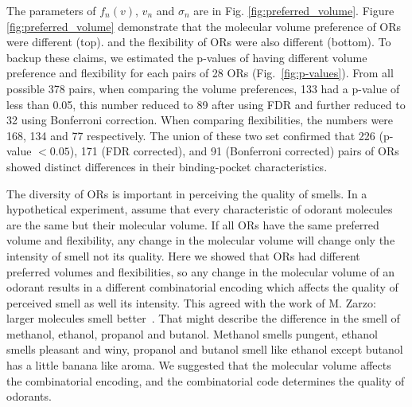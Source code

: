\documentclass[11pt]{paper} %
\newcommand{\numberofreceptors}{ 28 }
\begin{document}
The parameters of $f_n(v)$, $v_n$ and $\sigma_n$ are in Fig. \ref{fig:preferred_volume}.
Figure \ref{fig:preferred_volume} demonstrate that the molecular volume preference of ORs were different (top). 
and the flexibility of ORs were also different (bottom).
To backup these claims, 
we estimated the p-values of having different volume preference and flexibility for each pairs of \numberofreceptors ORs
(Fig.~\ref{fig:p-values}). 
From all possible 378 pairs, 
when comparing the volume preferences, 
133 had a p-value of less than 0.05, 
this number reduced to 89 after using FDR and further reduced to 32 using Bonferroni correction.
When comparing flexibilities, 
the numbers were 168, 134 and 77 respectively. 
The union of these two set confirmed that 226 (p-value $<0.05$), 171 (FDR corrected), and 91 (Bonferroni corrected) pairs of ORs showed distinct differences in their binding-pocket characteristics.

The diversity of ORs is important in perceiving the quality of smells. 
In a hypothetical experiment, 
assume that every characteristic of odorant molecules are the same but their molecular volume.
If all ORs  have the same preferred volume and flexibility, 
any change in the molecular volume will change only the intensity of smell not its quality.
Here we showed that ORs  had different preferred volumes and flexibilities, 
so any change in the molecular volume of an odorant results in a different combinatorial encoding which affects the quality of perceived smell as well its intensity.
This agreed with the work of M. Zarzo: larger molecules  smell better~\cite{zarzo2011}.
That might describe the difference in the smell of methanol, ethanol, propanol and butanol. 
Methanol smells pungent, ethanol smells pleasant and winy, propanol and butanol smell like ethanol except butanol has a little banana like aroma.
We suggested that the molecular volume affects the combinatorial encoding, 
and the combinatorial code determines the quality of odorants.
\end{document}
